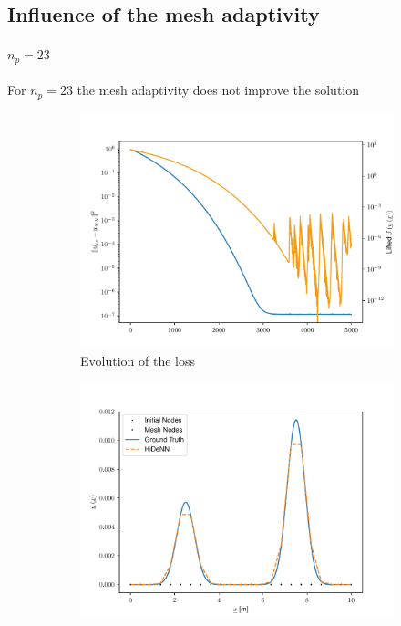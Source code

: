\subsection{Influence of the mesh adaptivity}
\paragraph{$n_p=23$}
For $n_p=23$ the mesh adaptivity does not improve the solution

\begin{figure}
    \begin{subfigure}{0.3\linewidth}
        \centering
        \includegraphics[width=\linewidth]{Figures/Loss_Comaprison_Frozen.pdf}
        \caption{Evolution of the loss}
    \end{subfigure}
    \begin{subfigure}{0.3\linewidth}
        \centering
        \includegraphics[width=\linewidth]{Figures/Solution_displacement_Frozen.pdf}

\end{subfigure}
\end{figure}
